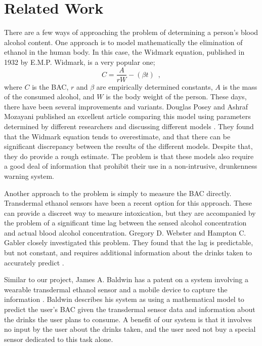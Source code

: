 \section{Related Work}
There are a few ways of approaching the problem of determining a person's blood alcohol content. One approach is to model mathematically the elimination of ethanol in the human body. In this case, the Widmark equation, published in 1932 by E.M.P. Widmark, is a very popular one; \begin{equation}C=\frac{A}{rW}-(\beta t) \enspace ,
\end{equation} where $C$ is the BAC, $r$ and $\beta$ are empirically determined constants, $A$ is the mass of the consumed alcohol, and $W$ is the body weight of the person.
	These days, there have been several improvements and variants. Douglas Posey and Ashraf Mozayani published an excellent article comparing this model using parameters determined by different researchers and discussing different models \cite{Posey:2007}. They found that the Widmark equation tends to overestimate, and that there can be significant discrepancy between the results of the different models. Despite that, they do provide a rough estimate. The problem is that these models also require a good deal of information that prohibit their use in a non-intrusive, drunkenness warning system.

Another approach to the problem is simply to measure the BAC directly. Transdermal ethanol sensors have been a recent option for this approach. These can provide a discreet way to measure intoxication, but they are accompanied by the problem of a significant time lag between the sensed alcohol concentration and actual blood alcohol concentration. Gregory D. Webster and Hampton C. Gabler closely investigated this problem. They found that the lag is predictable, but not constant, and requires additional information about the drinks taken to accurately predict \cite{Webster:2007}.

Similar to our project, James A. Baldwin has a patent on a system involving a wearable transdermal ethanol sensor and a mobile device to capture the information \cite{Baldwin:2014}. Baldwin describes his system as using a mathematical model to predict the user's BAC given the transdermal sensor data and information about the drinks the user plans to consume. A benefit of our system is that it involves no input by the user about the drinks taken, and the user need not buy a special sensor dedicated to this task alone.

